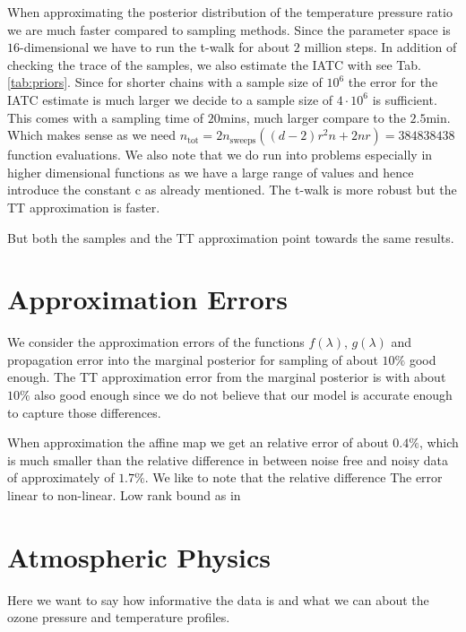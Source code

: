 When approximating the posterior distribution of the temperature pressure ratio we are much faster compared to sampling methods.
Since the parameter space is $16$-dimensional we have to run the t-walk for about $2$ million steps.
In addition of checking the trace of the samples, we also estimate the IATC with \cite{UwerrM} see Tab. \ref{tab:priors}.
Since for shorter chains with a sample size of $10^6$ the error for the IATC estimate is much larger we decide to a sample size of $4 \cdot 10^6$ is sufficient.
This comes with a sampling time of $20$mins, much larger compare to the $2.5$min.
Which makes sense as we need $n_{\text{tot}} = 2n_{\text{sweeps}}((d-2)r^2n+ 2nr) = 384838438$ function evaluations.
We also note that we do run into problems especially in higher dimensional functions as we have a large range of values and hence introduce the constant c as already mentioned.
The t-walk is more robust but the TT approximation is faster.

But both the samples and the TT approximation point towards the same results.


\section{Approximation Errors}
We consider the approximation errors of the functions $f(\lambda)$, $g(\lambda)$ and propagation error into the marginal posterior for sampling of about $10\%$ good enough.
The TT approximation error from the marginal posterior is with about $10\%$ also good enough since we do not believe that our model is accurate enough to capture those differences.

When approximation the affine map we get an relative error of about $0.4\%$, which is much smaller than the relative difference in between noise free and noisy data of approximately of $1.7 \%$.
We like to note that the relative difference 
The error linear to non-linear.
Low rank bound as in \cite{Rohrbach2022tterror}
\section{Atmospheric Physics}
Here we want to say how informative the data is and what we can about the ozone pressure and temperature profiles.

